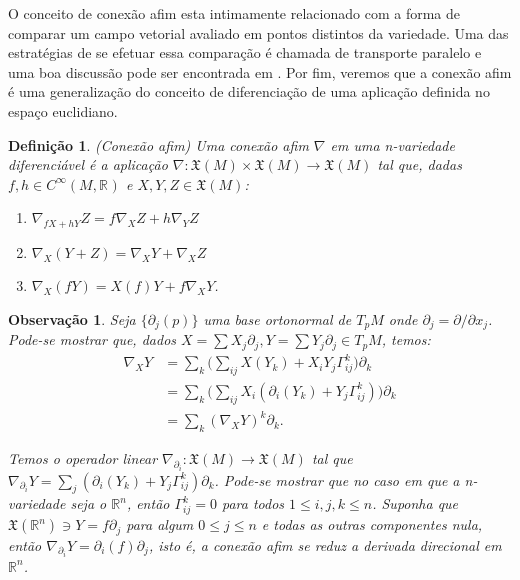 \documentclass[12pt]{book}
\newtheorem{definicao}[teorema]{Definição}
\newtheorem{observacao}[teorema]{Observação}
\newcommand{\campossuaves}[1]{\mathfrak{X}(#1)}
\newcommand{\funcoessuaves}[1]{C^{\infty}(#1, \real{})}
\newcommand{\real}[1]{\mathbb{R}^{#1}}
\begin{document}
	O conceito de conexão afim esta intimamente relacionado com a forma de comparar um campo vetorial avaliado em pontos distintos da variedade. Uma das estratégias de se efetuar essa comparação é chamada de transporte paralelo e uma boa discussão pode ser encontrada em \cite{nakahara}. Por fim, veremos que a conexão afim é uma generalização do conceito de diferenciação de uma aplicação definida no espaço euclidiano.
	
	\begin{definicao}
		(Conexão afim) Uma conexão afim $\nabla$ em uma n-variedade diferenciável é a aplicação $\nabla: \campossuaves{M} \times \campossuaves{M} \to \campossuaves{M}$ tal que, dadas $f,h \in \funcoessuaves{M}$ e $X,Y,Z \in \campossuaves{M}$:
		\begin{enumerate}
			\item $\nabla_{fX+hY}Z = f\nabla_{X}Z+h\nabla_{Y}Z$
			\item $\nabla_{X}(Y+Z) = \nabla_{X}Y+ \nabla_{X}Z$
			\item $\nabla_{X}(fY) = X(f)Y+f\nabla_{X}Y$.
		\end{enumerate}
	\end{definicao}
	
	\begin{observacao}\label{observacao_conexao_afim}
		Seja $\{\partial_{j}(p)\}$ uma base ortonormal de $T_{p}M$ onde $\partial_{j} = \partial/\partial x_{j}$. Pode-se mostrar que, dados $X=\sum X_{j}\partial_{j}, Y=\sum Y_{j}\partial_{j} \in T_{p}M$, temos:
		$$
		\begin{aligned}
		\nabla_{X}Y &= 
		\sum_{k} \Big( \sum_{ij} X(Y_{k}) + X_{i}Y_{j} \Gamma^{k}_{ij}\Big)\partial_{k} 
		\\
		&= 
		\sum_{k} \Big( \sum_{ij} X_{i} (\partial_{i}(Y_{k}) + Y_{j} \Gamma^{k}_{ij})\Big)\partial_{k} 
		 \\
		&= \sum_{k} (\nabla_{X}Y)^{k}\partial_{k}.
		\end{aligned} 
		$$
		
		Temos o operador linear $\nabla_{\partial_{i}}: \campossuaves{M} \to \campossuaves{M}$ tal que $\nabla_{\partial_{i}}Y = \sum_{j}  (\partial_{i}(Y_{k}) + Y_{j} \Gamma^{k}_{ij})\partial_{k} $. Pode-se mostrar que no caso em que a n-variedade seja o $\real{n}$, então $\Gamma_{ij}^{k}=0$ para todos $1\leq i,j,k \leq n$. Suponha que $\campossuaves{\real{n}} \ni Y = f\partial_{j}$ para algum $0 \leq j \leq n$ e todas as outras componentes nula, então $\nabla_{\partial_{i}}Y = \partial_{i}(f)\partial_{j} $, isto é, a conexão afim se reduz a derivada direcional em $\real{n}$.
	\end{observacao}
	
\end{document}

